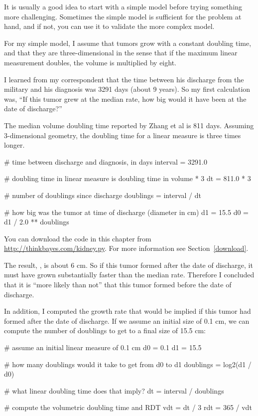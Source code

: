 \documentclass[12pt]{book}
\theoremstyle{exercise}
\begin{document}
It is usually a good idea to start with a simple model before
trying something more challenging.  Sometimes the simple model is
sufficient for the problem at hand, and if not, you can use it
to validate the more complex model.

For my simple model, I assume that tumors grow with a constant
doubling time, and that they are three-dimensional in the sense that
if the maximum linear measurement doubles, the volume is multiplied by
eight.

I learned from my correspondent that the time between his discharge
from the military and his diagnosis was 3291 days (about 9 years).
So my first calculation was, ``If this tumor grew at the median
rate, how big would it have been at the date of discharge?''

The median volume doubling time reported by Zhang et al is 811 days.
Assuming 3-dimensional geometry, the doubling time for a linear
measure is three times longer.

\begin{code}
    # time between discharge and diagnosis, in days 
    interval = 3291.0

    # doubling time in linear measure is doubling time in volume * 3
    dt = 811.0 * 3

    # number of doublings since discharge
    doublings = interval / dt

    # how big was the tumor at time of discharge (diameter in cm)
    d1 = 15.5
    d0 = d1 / 2.0 ** doublings
\end{code}

You can download the code in this chapter from
\url{http://thinkbayes.com/kidney.py}.  For more information
see Section~\ref{download}.

The result, , is about 6 cm.  So if this tumor formed after
the date of discharge, it must have grown substantially faster than
the median rate.  Therefore I concluded that it is ``more likely than
not'' that this tumor formed before the date of discharge.

In addition, I computed the growth rate that would be implied
if this tumor had formed after the date of discharge.  If we
assume an initial size of 0.1 cm, we can compute the number of
doublings to get to a final size of 15.5 cm:

\begin{code}
    # assume an initial linear measure of 0.1 cm
    d0 = 0.1
    d1 = 15.5

    # how many doublings would it take to get from d0 to d1
    doublings = log2(d1 / d0)

    # what linear doubling time does that imply?
    dt = interval / doublings

    # compute the volumetric doubling time and RDT
    vdt = dt / 3
    rdt = 365 / vdt
\end{code}
\end{document}
